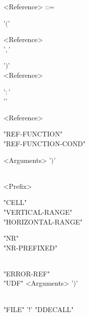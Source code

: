 \begin{grammar}
	<Reference> ::= \begin{syntdiag}[\footnotesize\sdlengths]
		\begin{stack} '$($' \begin{rep} <Reference> \\  '$,$' \end{rep} '$)$' \\
			<Reference> \begin{stack} '$:$' \\ '' \end{stack} <Reference> \\
			\begin{stack} "REF-FUNCTION" \\ "REF-FUNCTION-COND" \end{stack} <Arguments> '$)$' \\
			\begin{stack} \\
				<Prefix>
			\end{stack}
			\begin{stack}
				"CELL" \\
				"VERTICAL-RANGE" \\
				"HORIZONTAL-RANGE" \\
				\begin{stack} "NR" \\ "NR-PREFIXED" \end{stack} \\
				"ERROR-REF" \\
				"UDF" <Arguments> '$)$'
			\end{stack}
			\\"FILE" '$!$' "DDECALL"
		\end{stack}
	\end{syntdiag}
\end{grammar}